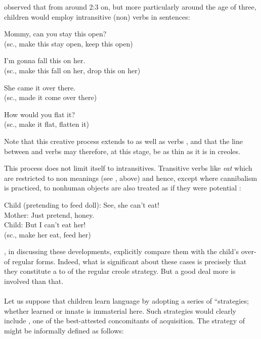 
\citet{Bowerman1974} observed that from around 2:3 on, but more particularly around the age of three, children would employ intransitive (non) verbs in  sentences:

\ea\label{ex:3:77}
Mommy, can you stay this open?\\
\glt (sc., make this stay open, keep this open)
\z

\ea\label{ex:3:78}
I'm gonna fall this on her.\\
\glt (sc., make this fall on her, drop this on her) 
\z

\ea\label{ex:3:79}
She came it over there.\\
\glt (sc., made it come over there)
\z

\ea\label{ex:3:80}
How would you flat it?\\
\glt (sc., make it flat, flatten it)
\z

\noindent Note that this creative process extends to  as well as verbs , and that the line between  and verbs may therefore, at this stage, be as thin as it is in creoles.

This process does not limit itself to intransitives. Transitive verbs like \textit{eat} which are restricted to non meanings (see ,  above) and hence, except where cannibalism is practiced, to nonhuman objects are also treated as if they were potential :

\ea\label{ex:3:81}
Child (pretending to feed doll): See, she can't eat!\\
Mother: Just pretend, honey.\\
Child: But I can't eat her!\\
(sc., make her eat, feed her)
\z

\citet[511]{ClarkEtAl1977}, in discussing these developments, explicitly compare them with the child's over- of regular  forms. Indeed, what is significant about these cases is precisely that they constitute a  to  of the regular creole strategy. But a good deal more is involved than that.\\\\

Let us suppose that children learn language by adopting a series of ``strategies; whether learned or innate is immaterial here. Such
strategies would clearly include , one of the best-attested concomitants of acquisition. The strategy of  might be informally defined as follows:

